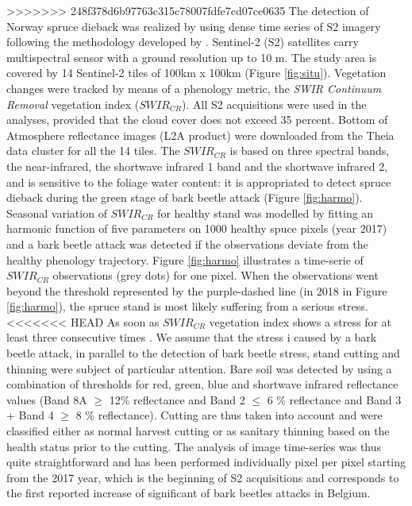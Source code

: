 \documentclass[3p,procedia]{elsarticle}
\begin{document}
>>>>>>> 248f378d6b97763c315c78007fdfe7cd07ce0635
The detection of Norway spruce dieback was realized by using dense time series of S2 imagery following the methodology developed by \cite{dutrieux_package_2021}.
Sentinel-2 (S2) satellites carry multispectral sensor with a ground resolution up to 10 m.
The study area is covered by 14 Sentinel-2 tiles of 100km x 100km (Figure \ref{fig:situ}).  
Vegetation changes were tracked by means of a phenology metric, the \textit{SWIR Continuum Removal} vegetation index ($SWIR_{CR}$).
All S2 acquisitions were used in the analyses, provided that the cloud cover does not exceed 35 percent. 
Bottom of Atmosphere reflectance images (L2A product) were downloaded from the Theia data cluster \citep{theia_team} for all the 14 tiles.
The $SWIR_{CR}$ is based on three spectral bands, the near-infrared, the shortwave infrared 1 band and the shortwave infrared 2, and is sensitive to the foliage water content: it is appropriated to detect spruce dieback during the green stage of bark beetle attack (Figure \ref{fig:harmo}).
Seasonal variation of $SWIR_{CR}$ for healthy stand was modelled by fitting an harmonic function of five parameters on 1000 healthy spuce pixels (year 2017) and a bark beetle attack was detected if the observations deviate from the healthy phenology trajectory. 
Figure \ref{fig:harmo} illustrates a time-serie of $SWIR_{CR}$ observations (grey dots) for one pixel. 
When the observations went beyond the threshold represented by the purple-dashed line (in 2018 in Figure \ref{fig:harmo}), the spruce stand is most likely suffering from a serious stress.
<<<<<<< HEAD
As soon as $SWIR_{CR}$ vegetation index shows a stress for at least three consecutive times \cite{dutrieux_package_2021}.
We assume that the stress i caused by a bark beetle attack, in parallel to the detection of bark beetle stress, stand cutting and thinning were subject of particular attention. 
Bare soil was detected by using a combination of thresholds for red, green, blue and shortwave infrared reflectance values (Band 8A $\geq$ 12\% reflectance and Band 2 $\leq$ 6 \% reflectance and Band 3 + Band 4 $\geq$ 8 \% reflectance).
Cutting are thus taken into account and were classified either as normal harvest cutting or as sanitary thinning based on the health status prior to the cutting.
The analysis of image time-series was thus quite straightforward and has been performed individually pixel per pixel starting from the 2017 year, which is the beginning of S2 acquisitions and corresponds to the first reported increase of significant of bark beetles attacks in Belgium. 
\end{document}
